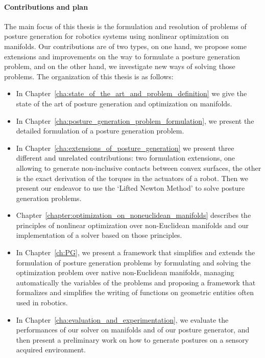 \paragraph{Contributions and plan}
The main focus of this thesis is the formulation and resolution of problems of posture generation for robotics systems using nonlinear optimization on manifolds.
Our contributions are of two types, on one hand, we propose some extensions and improvements on the way to formulate a posture generation problem, and on the other hand, we investigate new ways of solving those problems.
The organization of this thesis is as follows:
\begin{itemize}
  \item In Chapter~\ref{cha:state_of_the_art_and_problem_definition} we give the state of the art of posture generation and optimization on manifolds.
  \item In Chapter~\ref{cha:posture_generation_problem_formulation}, we present the detailed formulation of a posture generation problem.
  \item In Chapter~\ref{cha:extensions_of_posture_generation} we present three different and unrelated contributions: two formulation extensions, one allowing to generate non-inclusive contacts between convex surfaces, the other is the exact derivation of the torques in the actuators of a robot.
  Then we present our endeavor to use the `Lifted Newton Method' to solve posture generation problems.
  \item Chapter~\ref{chapter:optimization_on_noneuclidean_manifolds} describes the principles of nonlinear optimization over non-Euclidean manifolds and our implementation of a solver based on those principles.
  \item In Chapter~\ref{ch:PG}, we present a framework that simplifies and extends the formulation of posture generation problems by formulating and solving the optimization problem over native non-Euclidean manifolds, managing automatically the variables of the problems and proposing a framework that formalizes and simplifies the writing of functions on geometric entities often used in robotics.
  \item In Chapter~\ref{cha:evaluation_and_experimentation}, we evaluate the performances of our solver on manifolds and of our posture generator, and then present a preliminary work on how to generate postures on a sensory acquired environment.
\end{itemize}


